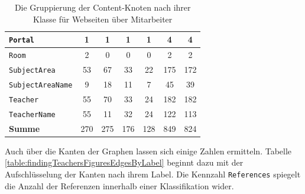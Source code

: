 \begin{table}[htb]
\begin{tabular}{|l|c|c|c|c|c|c|}
            \texttt{Portal}             & 1                                  & 1                                   & 1                                    & 1                                  & 4                                   & 4                                  \\ \hline
            \texttt{Room}               & 2                                  & 0                                   & 0                                    & 0                                  & 2                                   & 2                                  \\ \hline
            \texttt{SubjectArea}        & 53                                 & 67                                  & 33                                   & 22                                 & 175                                 & 172                                \\ \hline
            \texttt{SubjectAreaName}    & 9                                  & 18                                  & 11                                   & 7                                  & 45                                  & 39                                 \\ \hline
            \texttt{Teacher}            & 55                                 & 70                                  & 33                                   & 24                                 & 182                                 & 182                                \\ \hline
            \texttt{TeacherName}        & 55                                 & 11                                  & 32                                   & 24                                 & 122                                 & 113                                \\ \hline
            \hline
            \textbf{Summe}     & 270                                & 275                                 & 176                                  & 128                                & 849                                 & 824                                \\ \hline
        \end{tabular}
        \caption{Die Gruppierung der Content-Knoten nach ihrer Klasse für Webseiten über Mitarbeiter}
        \label{table:findingsTeachersFiguresContentNodesByClass}
    \end{table}

    Auch über die Kanten der Graphen lassen sich einige Zahlen ermitteln.
    Tabelle \ref{table:findingTeachersFiguresEdgesByLabel} beginnt dazu
    mit der Aufschlüsselung der Kanten nach ihrem Label.
    Die Kennzahl \texttt{References} spiegelt die Anzahl der Referenzen innerhalb einer Klassifikation wider.

